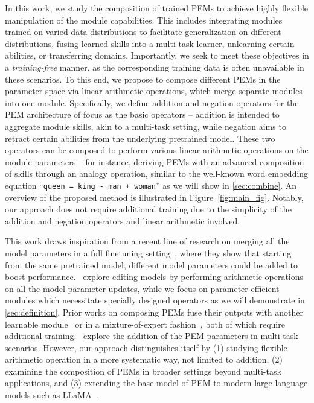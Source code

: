 In this work, we study the composition of trained PEMs to achieve highly flexible manipulation of the module capabilities. This includes integrating modules trained on varied data distributions to facilitate generalization on different distributions, fusing learned skills into a multi-task learner, unlearning certain abilities, or 
transferring domains.
Importantly, we seek to meet these objectives in a \emph{training-free} manner, as the corresponding training data is often unavailable in these scenarios. 
To this end, we propose to compose different PEMs in the parameter space via linear arithmetic operations, which merge separate modules into one module. 
Specifically, we define addition and negation operators for the PEM architecture of focus as the basic operators -- addition is intended to aggregate module skills, akin to a multi-task setting, while negation aims to retract certain abilities from the underlying pretrained model. 
These two operators can be composed to perform various linear arithmetic operations on the module parameters -- for instance, deriving PEMs with an advanced composition of skills through an analogy operation, similar to the well-known word embedding equation ``\texttt{queen = king - man + woman}'' as we will show in \textsection\ref{sec:combine}.
An overview of the proposed method is illustrated in Figure~\ref{fig:main_fig}.
Notably, our approach does not require additional training due to the simplicity of the addition and negation operators and linear arithmetic involved. 

This work draws inspiration from a recent line of research on merging all the model parameters in a full finetuning setting~\citep{wortsman2022model,matena2022merging,jin2022dataless}, where they show that starting from the same pretrained model, different model parameters could be added to boost performance.~\citet{ilharco2022editing} explore editing models by performing arithmetic operations on all the model parameter updates, while we focus on parameter-efficient modules which necessitate specially designed operators as we will demonstrate in \textsection\ref{sec:definition}. 
Prior works on composing PEMs fuse their outputs with another learnable module~\citep{pfeiffer2021adapterfusion} or in a mixture-of-expert fashion~\citep{wang2022adamix}, both of which require additional training.~\citet{qin2022exploring,chronopoulou2023adaptersoup} explore the addition of the PEM parameters in multi-task scenarios. 
However, our approach distinguishes itself by (1) studying flexible arithmetic operation in a more systematic way, not limited to addition, (2) examining the composition of PEMs in broader settings beyond multi-task applications, and (3) extending the base model of PEM to modern large language models such as LLaMA~\citep{touvron2023llama}.


